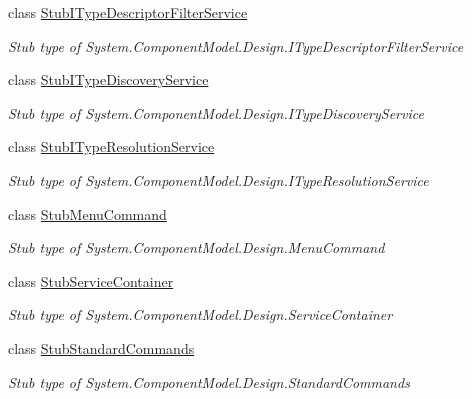 \begin{DoxyCompactItemize}
class \hyperlink{class_system_1_1_component_model_1_1_design_1_1_fakes_1_1_stub_i_type_descriptor_filter_service}{Stub\-I\-Type\-Descriptor\-Filter\-Service}
\begin{DoxyCompactList}\small\item\em Stub type of System.\-Component\-Model.\-Design.\-I\-Type\-Descriptor\-Filter\-Service\end{DoxyCompactList}\item 
class \hyperlink{class_system_1_1_component_model_1_1_design_1_1_fakes_1_1_stub_i_type_discovery_service}{Stub\-I\-Type\-Discovery\-Service}
\begin{DoxyCompactList}\small\item\em Stub type of System.\-Component\-Model.\-Design.\-I\-Type\-Discovery\-Service\end{DoxyCompactList}\item 
class \hyperlink{class_system_1_1_component_model_1_1_design_1_1_fakes_1_1_stub_i_type_resolution_service}{Stub\-I\-Type\-Resolution\-Service}
\begin{DoxyCompactList}\small\item\em Stub type of System.\-Component\-Model.\-Design.\-I\-Type\-Resolution\-Service\end{DoxyCompactList}\item 
class \hyperlink{class_system_1_1_component_model_1_1_design_1_1_fakes_1_1_stub_menu_command}{Stub\-Menu\-Command}
\begin{DoxyCompactList}\small\item\em Stub type of System.\-Component\-Model.\-Design.\-Menu\-Command\end{DoxyCompactList}\item 
class \hyperlink{class_system_1_1_component_model_1_1_design_1_1_fakes_1_1_stub_service_container}{Stub\-Service\-Container}
\begin{DoxyCompactList}\small\item\em Stub type of System.\-Component\-Model.\-Design.\-Service\-Container\end{DoxyCompactList}\item 
class \hyperlink{class_system_1_1_component_model_1_1_design_1_1_fakes_1_1_stub_standard_commands}{Stub\-Standard\-Commands}
\begin{DoxyCompactList}\small\item\em Stub type of System.\-Component\-Model.\-Design.\-Standard\-Commands\end{DoxyCompactList}\item 

\end{DoxyCompactItemize}
